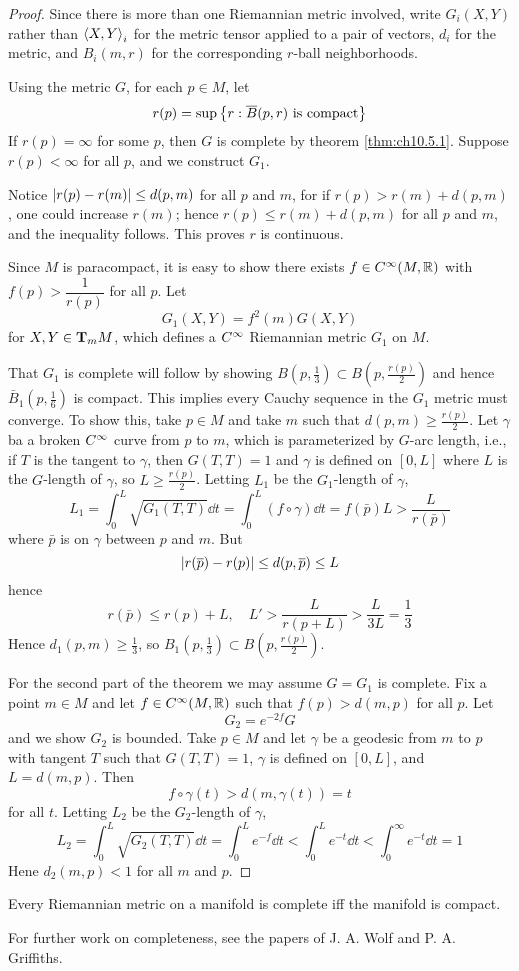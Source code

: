 \documentclass[../main]{subfiles}
\begin{document}
\begin{proof}
Since there is more than one Riemannian metric involved, write $G_i(X,Y)$ rather than $\ip XY_i$ for the metric tensor applied to a pair of vectors, $d_i$ for the metric, and $B_i(m,r)$ for the corresponding $r$-ball neighborhoods.

Using the metric $G$, for each $p\in M$, let
\[r(p) = \sup\brc{r: \bar B(p,r) \text{ is compact}}\]
If $r(p)=\infty$ for some $p$, then $G$ is complete by theorem \ref{thm:ch10.5.1}. Suppose $r(p)<\infty$ for all $p$, and we construct $G_1$.

Notice $\norm{r(p)-r(m)}\le d(p,m)$ for all $p$ and $m$, for if $r(p)>r(m)+d(p,m)$, one could increase $r(m)$; hence $r(p)\le r(m)+d(p,m)$ for all $p$ and $m$, and the inequality follows. This proves $r$ is continuous.

Since $M$ is paracompact, it is easy to show there exists $f\in\CInfty(M,\bR)$ with $f(p)>\dfrac{1}{r(p)}$ for all $p$. Let 
\[G_1(X,Y) = f^2(m)G(X,Y)\]
for $X,Y\in\ts Mm$, which defines a $\CInfty$ Riemannian metric $G_1$ on $M$.

That $G_1$ is complete will follow by showing $B(p,\tfrac13)\subset B(p,\tfrac{r(p)}{2})$ and hence $\bar B_1(p,\tfrac16)$ is compact. This implies every Cauchy sequence in the $G_1$ metric must converge. To show this, take $p\in M$ and take $m$ such that $d(p,m)\ge\frac{r(p)}{2}$. Let $\gamma$ ba a broken $\CInfty$ curve from $p$ to $m$, which is parameterized by $G$-arc length, i.e., if $T$ is the tangent to $\gamma$, then $G(T,T)=1$ and $\gamma$ is defined on $[0,L]$ where $L$ is the $G$-length of $\gamma$, so $L\ge\frac{r(p)}{2}$. Letting $L_1$ be the $G_1$-length of $\gamma$,
\[L_1 = \int_0^L\sqrt{G_1(T,T)}\dd t
= \int_0^L(f\circ\gamma)\dd t
= f(\bar p)L
> \frac{L}{r(\bar p)}\]
where $\bar p$ is on $\gamma$ between $p$ and $m$. But
\[\norm{r(\bar p)-r(p)}\le d(p,\bar p)\le L\]
hence
\[r(\bar p)\le r(p)+L,
\quad L'>\frac{L}{r(p+L)}>\frac{L}{3L}=\frac13\]
Hence $d_1(p,m)\ge\frac13$, so $B_1(p,\tfrac13)\subset B(p,\tfrac{r(p)}{2})$.

For the second part of the theorem we may assume $G=G_1$ is complete. Fix a point $m\in M$ and let $f\in\CInfty(M,\bR)$ such that $f(p)>d(m,p)$ for all $p$. Let
\[G_2=e^{-2f}G\]
and we show $G_2$ is bounded. Take $p\in M$ and let $\gamma$ be a geodesic from $m$ to $p$ with tangent $T$ such that $G(T,T)=1$, $\gamma$ is defined on $[0,L]$, and $L=d(m,p)$. Then
\[f\circ\gamma(t)>d(m,\gamma(t))=t\]
for all $t$. Letting $L_2$ be the $G_2$-length of $\gamma$,
\[L_2 = \int_0^L\sqrt{G_2(T,T)}\dd t 
= \int_0^Le^{-f}\dd t
< \int_0^Le^{-t}\dd t
<\int_0^\infty e^{-t}\dd t
= 1\]
Hene $d_2(m,p)<1$ for all $m$ and $p$.
\end{proof}



\begin{corollary} \label{cor:ch10.5.4}
Every Riemannian metric on a manifold is complete iff the manifold is compact.
\end{corollary}



For further work on completeness, see the papers of J. A. Wolf and P. A. Griffiths.
\end{document}

